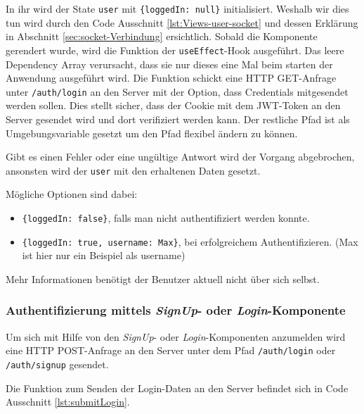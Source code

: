 In ihr wird der State \verb|user| mit \verb|{loggedIn: null}| initialisiert. Weshalb wir dies tun wird durch den Code Ausschnitt \ref{lst:Views-user-socket} und dessen Erklärung in Abschnitt \ref{sec:socket-Verbindung} ersichtlich. Sobald die Komponente gerendert wurde, wird die Funktion der \verb|useEffect|-Hook ausgeführt. Das leere Dependency Array verursacht, dass sie nur dieses eine Mal beim starten der Anwendung ausgeführt wird. Die Funktion schickt eine HTTP GET-Anfrage unter \verb|/auth/login| an den Server mit der Option, dass Credentials mitgesendet werden sollen. Dies stellt sicher, dass der Cookie mit dem JWT-Token an den Server gesendet wird und dort verifiziert werden kann. Der restliche Pfad ist als Umgebungsvariable gesetzt um den Pfad flexibel ändern zu können.

Gibt es einen Fehler oder eine ungültige Antwort wird der Vorgang abgebrochen, ansonsten wird der \verb|user| mit den erhaltenen Daten gesetzt.

Mögliche Optionen sind dabei:
\begin{itemize}
\item \verb|{loggedIn: false}|, falls man nicht authentifiziert werden konnte.
\item \verb|{loggedIn: true, username: Max}|, bei erfolgreichem Authentifizieren. (Max ist hier nur ein Beispiel als username)
\end{itemize}
Mehr Informationen benötigt der Benutzer aktuell nicht über sich selbst.

\subsubsection{Authentifizierung mittels \textit{SignUp}- oder \textit{Login}-Komponente}
Um sich mit Hilfe von den \textit{SignUp}- oder \textit{Login}-Komponenten anzumelden wird eine HTTP POST-Anfrage an den Server unter dem Pfad \verb|/auth/login| oder \verb|/auth/signup| gesendet.

Die Funktion zum Senden der Login-Daten an den Server befindet sich in Code Ausschnitt \ref{lst:submitLogin}.

